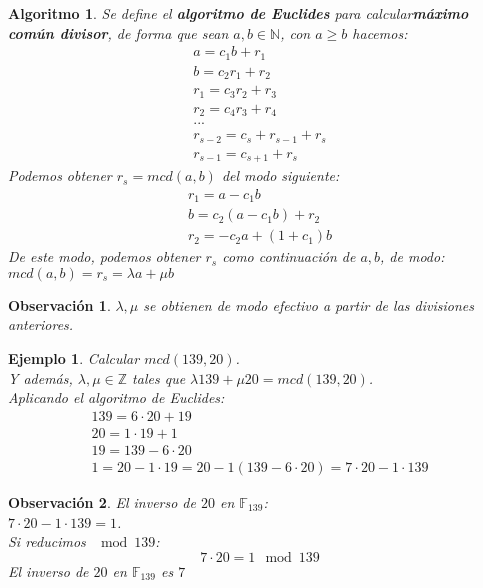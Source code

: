 \documentclass[spanish]{book}
\newtheorem{alg}{Algoritmo}
\newtheorem{ejem}{Ejemplo}
\newtheorem{obsv}{Observación}
\begin{document}
\begin{alg}
	Se define el \textbf{algoritmo de Euclides} para calcular\textbf{máximo común divisor}, de forma que sean $a, b \in \mathbb{N}$, con $a \geq b$ hacemos:
	\begin{eqnarray}
		a=c_1 b + r_1 \nonumber \\
		b=c_2 r_1 + r_2 \nonumber \\
		r_1=c_3 r_2 +  r_3 \nonumber \\
		r_2 = c_4 r_3 + r_4 \nonumber \\
		... \nonumber \\
		r_{s-2}=c_s+r_{s-1}+r_s \nonumber \\
		r_{s-1}=c_{s+1}+r_s \nonumber 
	\end{eqnarray}
	Podemos obtener $r_s=mcd(a, b)$ del modo siguiente: 
	\begin{eqnarray}
		r_1=a-c_1b \nonumber \\
		b = c_2(a-c_1b) + r_2  \nonumber \\
		r_2 = -c_2 a + (1+c_1)b \nonumber
	\end{eqnarray}
	De este modo, podemos obtener $r_s$ como continuación de $a, b$, de modo: \\
	$mcd(a, b)=r_s=\lambda a + \mu b$
\end{alg}
\begin{obsv}
	$\lambda, \mu$ se obtienen de modo efectivo a partir de las divisiones anteriores.
\end{obsv}

\begin{ejem}
	Calcular $mcd(139, 20)$. \\
	Y además, $\lambda, \mu \in \mathbb{Z}$ tales que $\lambda 139 + \mu 20  = mcd(139, 20)$. \\
	Aplicando el algoritmo de Euclides:
	\begin{eqnarray}
		139=6 \cdot 20+19 \nonumber \\
		20=1 \cdot 19 + 1 \nonumber \\
		19=139-6\cdot 20 \nonumber \\
		1 = 20 - 1 \cdot 19=20-1(139-6\cdot 20)=7\cdot 20 - 1 \cdot 139 \nonumber
	\end{eqnarray}
\end{ejem}

\begin{obsv}
	El inverso de $20$ en $\mathbb{F}_{139}$: \\
	$7 \cdot 20 - 1 \cdot 139 = 1$. \\
	Si reducimos $\mod 139$: \\
	\begin{equation*}
	7\cdot 20 = 1 \mod 139
	\end{equation*}
	El inverso de $20$ en $\mathbb{F}_{139}$ es $7$
\end{obsv}
\end{document}

